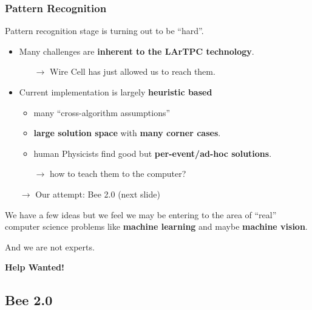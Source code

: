 \documentclass[xcolor=dvipsnames]{beamer}
\begin{document}
\begin{frame}
  \frametitle{Pattern Recognition}
  Pattern recognition stage is turning out to be ``hard''.
  \footnotesize
  \begin{itemize}
  \item Many challenges are \textbf{inherent to the LArTPC technology}.  
    \begin{itemize}\scriptsize
    \item[$\rightarrow$] Wire Cell has just allowed us to reach them.
    \end{itemize}
  \item Current implementation is largely \textbf{heuristic based}
    \begin{itemize}\scriptsize
    \item many ``cross-algorithm assumptions''
    \item \textbf{large solution space} with \textbf{many corner cases}.
    \item human Physicists find good but \textbf{per-event/ad-hoc solutions}.
    \item[$\rightarrow$] how to teach them to the computer?
    \end{itemize}
  \item[$\rightarrow$] Our attempt: Bee 2.0 (next slide) 
  \end{itemize}
  
  \vfill

  We have a few ideas but we feel we may be entering to the area of ``real'' computer science
  problems like \textbf{machine learning} and maybe \textbf{machine vision}.

  \vspace{2mm}

  And we are not experts. 

  \vspace{2mm}

  \textbf{Help Wanted!}

\end{frame}

\subsection{Bee 2.0}
\end{document}
